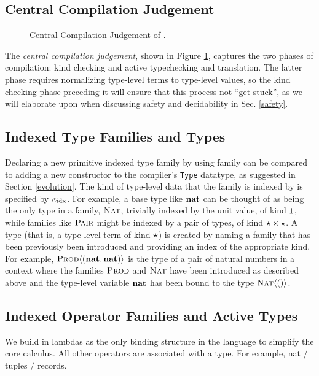 \documentclass{llncs}
\begin{document}
\subsection{Central Compilation Judgement}
\begin{figure}[t]
\small
\begin{mathpar}
\end{mathpar}
\vspace{-10pt}
\caption{\small Central Compilation Judgement of \atlam.}
\label{ccj}
\end{figure}
The \emph{central compilation judgement}, shown in Figure \ref{ccj}, captures the two phases of compilation: kind checking and active typechecking and translation. The latter phase requires normalizing type-level terms to type-level values, so the  kind checking phase preceding it will ensure that this process not ``get stuck'', as we will elaborate upon when discussing safety and decidability in Sec. \ref{safety}.

\subsection{Indexed Type Families and Types}\label{families}
Declaring a new primitive indexed type family by using \textsf{family} can be compared to adding a new constructor to the compiler's \lstinline{Type} datatype, as suggested in Section \ref{evolution}. The kind of type-level data that the family is indexed by is specified by $\kappaidx$. For example, a base type like $\tvar{nat}$ can be thought of as being the only type in a family, $\fvar{Nat}$, trivially indexed by the unit value, of kind $\kunit$, while families like $\fvar{Pair}$ might be indexed by a pair of types, of kind $\kpair{\kTypeBlur}{\kTypeBlur}$. A type (that is, a type-level term of kind $\kTypeBlur$) is created by naming a family that has been previously been introduced and providing an index of the appropriate kind. For example, $\ttype{Prod}{\tpair{\tvar{nat}}{\tvar{nat}}}$ is the type of a pair of natural numbers in a context where the families $\fvar{Prod}$ and $\fvar{Nat}$ have been introduced as described above and the type-level variable $\tvar{nat}$ has been bound to the type $\ttype{Nat}{\tunit}$.

\subsection{Indexed Operator Families and Active Types}\label{operators}
We build in lambdas as the only binding structure in the language to simplify the core calculus. All other operators are associated with a type. For example, nat / tuples / records.
\end{document}
